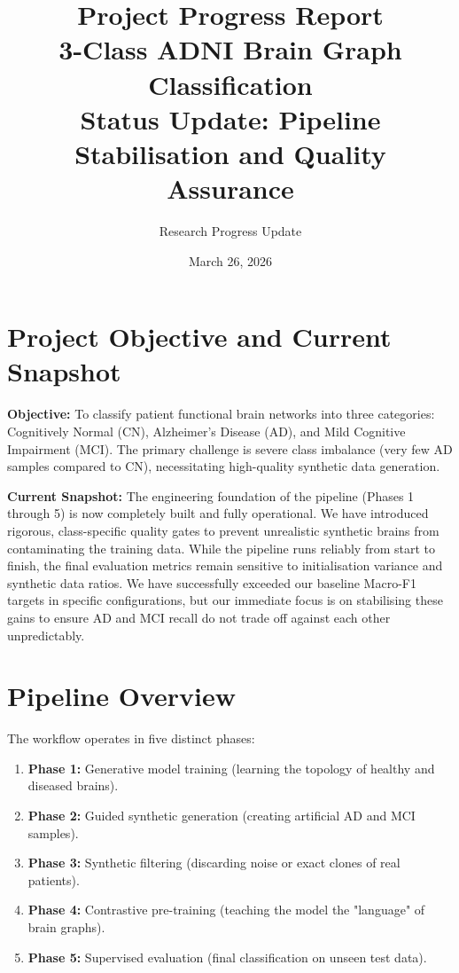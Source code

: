 \documentclass[11pt, a4paper]{article}
\title{\textbf{Project Progress Report\\
3-Class ADNI Brain Graph Classification\\[4pt]
{\large Status Update: Pipeline Stabilisation and Quality Assurance}}}
\author{Research Progress Update}
\date{March 26, 2026}
\begin{document}
\maketitle

\section{Project Objective and Current Snapshot}

\textbf{Objective:} To classify patient functional brain networks into three categories: Cognitively Normal (CN), Alzheimer's Disease (AD), and Mild Cognitive Impairment (MCI). The primary challenge is severe class imbalance (very few AD samples compared to CN), necessitating high-quality synthetic data generation.

\textbf{Current Snapshot:}
The engineering foundation of the pipeline (Phases 1 through 5) is now completely built and fully operational. We have introduced rigorous, class-specific quality gates to prevent unrealistic synthetic brains from contaminating the training data. While the pipeline runs reliably from start to finish, the final evaluation metrics remain sensitive to initialisation variance and synthetic data ratios. We have successfully exceeded our baseline Macro-F1 targets in specific configurations, but our immediate focus is on stabilising these gains to ensure AD and MCI recall do not trade off against each other unpredictably.

\section{Pipeline Overview}

The workflow operates in five distinct phases:
\begin{enumerate}[leftmargin=1.5em]
  \item \textbf{Phase 1:} Generative model training (learning the topology of healthy and diseased brains).
  \item \textbf{Phase 2:} Guided synthetic generation (creating artificial AD and MCI samples).
  \item \textbf{Phase 3:} Synthetic filtering (discarding noise or exact clones of real patients).
  \item \textbf{Phase 4:} Contrastive pre-training (teaching the model the "language" of brain graphs).
  \item \textbf{Phase 5:} Supervised evaluation (final classification on unseen test data).
\end{enumerate}
\end{document}
